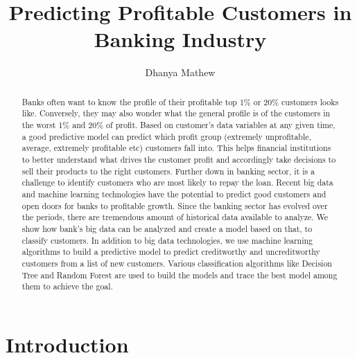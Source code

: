 \documentclass[sigconf]{acmart}
\begin{document}
\title{Predicting Profitable Customers in Banking Industry}


\author{Dhanya Mathew}


\renewcommand{\shortauthors}{G. v. Laszewski}


\begin{abstract}
Banks often want to know the profile of their profitable top 1\% or 20\% customers looks like. Conversely, they may also wonder what the general profile is of the customers in the worst 1\% and 20\% of profit. Based on customer's data variables at any given time, a good predictive model can predict which profit group (extremely unprofitable, average, extremely profitable etc) customers fall into. This helps financial institutions to better understand what drives the customer profit and accordingly take decisions to sell their products to the right customers. Further down in banking sector, it is a challenge to identify customers who are most likely to repay the loan. Recent big data and machine learning technologies have the potential to predict good customers and open doors for banks to profitable growth. Since the banking sector has evolved over the periods, there are tremendous amount of historical data available to analyze. We show how bank's big data can be analyzed and create a model based on that, to classify customers. In addition to big data technologies, we use machine learning algorithms to build a predictive model to predict creditworthy and uncreditworthy customers from a list of new customers. Various classification algorithms like Decision Tree and Random Forest are used to build the models and trace the best model among them to achieve the goal.

\end{abstract}



\maketitle



\section{Introduction}
\end{document}
